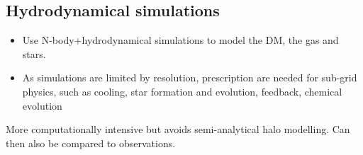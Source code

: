 \subsection{Hydrodynamical simulations}
\begin{itemize}
	\item Use N-body+hydrodynamical simulations to model the DM, the gas and stars.
	\item As simulations are limited by resolution, prescription are needed for sub-grid physics, such as cooling, star formation and evolution, feedback, chemical evolution
\end{itemize}
More computationally intensive but avoids semi-analytical halo modelling.
Can then also be compared to observations.
